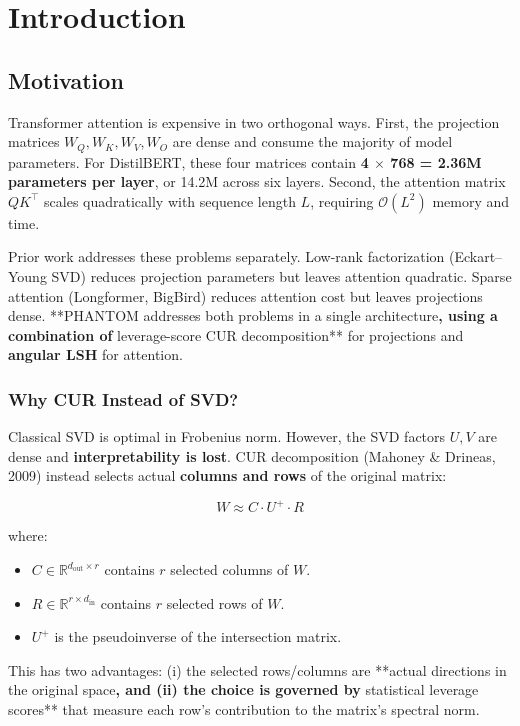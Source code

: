 
\section{Introduction}

\subsection{Motivation}

Transformer attention is expensive in two orthogonal ways. First, the 
projection matrices $W_Q, W_K, W_V, W_O$ are dense and consume the majority 
of model parameters. For DistilBERT, these four matrices contain 
\textbf{4 $\times$ 768  = 2.36M parameters per layer}, or 14.2M across six layers. Second, 
the attention matrix $Q K^\top$ scales quadratically with sequence length 
$L$, requiring $\mathcal{O}(L^2)$ memory and time.

Prior work addresses these problems separately. Low-rank factorization 
(Eckart--Young SVD) reduces projection parameters but leaves attention 
quadratic. Sparse attention (Longformer, BigBird) reduces attention cost but 
leaves projections dense. **PHANTOM addresses both problems in a single 
architecture\textbf{, using a combination of }leverage-score CUR decomposition** 
for projections and \textbf{angular LSH} for attention.

\subsubsection{Why CUR Instead of SVD?}

Classical SVD is optimal in Frobenius norm. However, the SVD factors $U, V$ 
are dense and \textbf{interpretability is lost}. CUR decomposition (Mahoney \& 
Drineas, 2009) instead selects actual \textbf{columns and rows} of the original 
matrix:

\[
W \approx C \cdot U^+ \cdot R
\tag{1.1}
\]

where:
\begin{itemize}
\item $C \in \mathbb{R}^{d_\text{out} \times r}$ contains $r$ selected columns of $W$.
\item $R \in \mathbb{R}^{r \times d_\text{in}}$ contains $r$ selected rows of $W$.
\item $U^+$ is the pseudoinverse of the intersection matrix.

\end{itemize}
This has two advantages: (i) the selected rows/columns are **actual directions 
in the original space\textbf{, and (ii) the choice is governed by }statistical 
leverage scores** that measure each row's contribution to the matrix's 
spectral norm.

